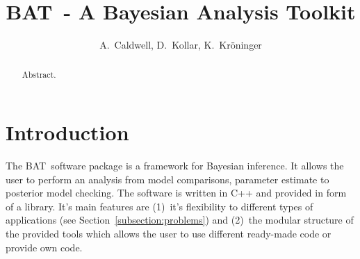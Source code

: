 \documentclass[11pt, a4paper]{article}
\newcommand{\BAT}{{\sc BAT}}
\begin{document}

\thispagestyle{empty} 

\begin{figure}
\end{figure} 

\title{\BAT\ - A {\sc Bayesian Analysis Toolkit}} 

\author{A.~Caldwell, D.~Kollar, K.~Kr\"oninger} 

\maketitle

\begin{abstract} 
Abstract. 
\end{abstract} 

\pagebreak 


\section{Introduction}

The \BAT\ software package is a framework for Bayesian inference. It
allows the user to perform an analysis from model comparisons,
parameter estimate to posterior model checking. The software is
written in C++ and provided in form of a library. It's main features
are (1)~it's flexibility to different types of applications (see
Section~\ref{subsection:problems}) and (2)~the modular structure of
the provided tools which allows the user to use different ready-made
code or provide own code. 
\end{document}
